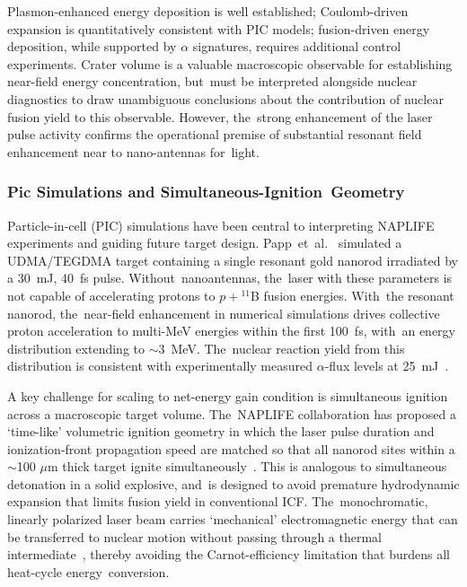 \documentclass[particles,article,accept,pdftex,moreauthors]{Definitions/mdpi}
\begin{document}
Plasmon-enhanced energy deposition is well established; Coulomb-driven expansion is quantitatively consistent with PIC models; fusion-driven energy deposition, while supported by $\alpha$ signatures, requires additional control experiments. Crater volume is a valuable macroscopic observable for establishing near-field energy concentration, but~must be interpreted alongside nuclear diagnostics to draw unambiguous conclusions about the contribution of nuclear fusion yield to this observable. However, the~strong enhancement of the laser pulse activity confirms the operational premise of substantial resonant field enhancement near to nano-antennas for~light.

\subsubsection{Pic Simulations and Simultaneous-Ignition~Geometry}\label{sssec:NAPLIFE_PIC}
Particle-in-cell (PIC) simulations have been central to interpreting NAPLIFE experiments and guiding future target design. Papp~et~al.~\cite{Papp:2023arXiv} simulated a UDMA/TEGDMA target containing a single resonant gold nanorod irradiated by a 30~mJ, 40~fs pulse. Without~nanoantennas, the~laser with these parameters is not capable of accelerating protons to $p+{}^{11}$B fusion energies. With~the resonant nanorod, the~near-field enhancement in numerical simulations drives collective proton acceleration to multi-MeV energies within the first 100~fs, with~an energy distribution extending to $\sim$3~MeV. The~nuclear reaction yield from this distribution is consistent with experimentally measured $\alpha$-flux levels at 25~mJ~\cite{Kroo2024pB}.

A key challenge for scaling to net-energy gain condition is simultaneous ignition across a macroscopic target volume. The~NAPLIFE collaboration has proposed a `time-like' volumetric ignition geometry in which the laser pulse duration and ionization-front propagation speed are matched so that all nanorod sites within a $\sim$100 $\mu$m thick target ignite simultaneously~\cite{Csernai:2025EPJ,Biro:2025EPJ}. This is analogous to simultaneous detonation in a solid explosive, and~is designed to avoid premature hydrodynamic expansion that limits fusion yield in conventional ICF. The~monochromatic, linearly polarized laser beam carries `mechanical' electromagnetic energy that can be transferred to nuclear motion without passing through a thermal intermediate~\cite{Csernai:2025EPJ}, thereby avoiding the Carnot-efficiency limitation that burdens all heat-cycle energy~conversion.
\end{document}
